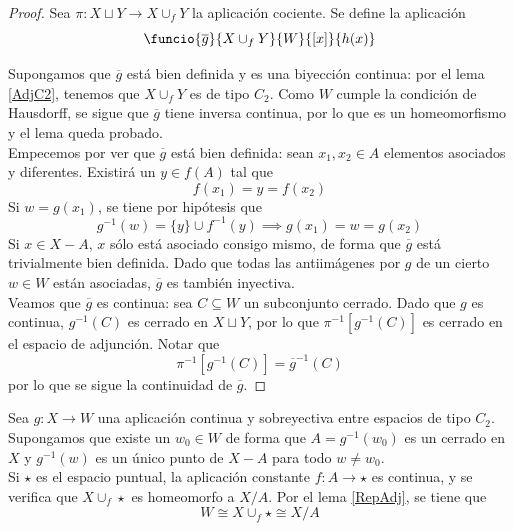 \begin{proof}
Sea $\pi: X\sqcup Y \longrightarrow X \cup_f Y$ la aplicación cociente. Se define la aplicación $$\funcio{\overline{g}}{X \cup_f Y}{W}{[x]}{h(x)}$$

Supongamos que $\overline{g}$ está bien definida y es una biyección continua: por el lema \ref{AdjC2}, tenemos que $X\cup_f Y$ es de tipo $C_2$. Como $W$ cumple la condición de Hausdorff, se sigue que $\overline{g}$ tiene inversa continua, por lo que es un homeomorfismo y el lema queda probado.
\\

Empecemos por ver que $\overline{g}$ está bien definida: sean $x_1, x_2 \in A$ elementos asociados y diferentes. Existirá un $y \in f(A)$ tal que $$f(x_1)=y=f(x_2)$$ Si $w=g(x_1)$, se tiene por hipótesis que $$g^{-1}(w)=\{y\}\cup f^{-1}(y) \implies g(x_1)=w=g(x_2)$$ Si $x \in X-A$, $x$ sólo está asociado consigo mismo, de forma que $\overline{g}$ está trivialmente bien definida. Dado que todas las antiimágenes por $g$ de un cierto $w \in W$ están asociadas, $\overline{g}$ es también inyectiva.
\\

Veamos que $\overline{g}$ es continua: sea $C \subseteq W$ un subconjunto cerrado. Dado que $g$ es continua, $g^{-1}(C)$ es cerrado en $X\sqcup Y$, por lo que $\pi^{-1}[g^{-1}(C)]$ es cerrado en el espacio de adjunción. Notar que $$\pi^{-1}[g^{-1}(C)]=\overline{g}^{-1}(C)$$ por lo que se sigue la continuidad de $\overline{g}$.
\end{proof}

Sea $g: X \longrightarrow W$ una aplicación continua y sobreyectiva entre espacios de tipo $C_2$. Supongamos que existe un $w_0 \in W$ de forma que $A=g^{-1}(w_0)$ es un cerrado en $X$ y $g^{-1}(w)$ es un único punto de $X-A$ para todo $w\neq w_0$.
\\

Si $\star$ es el espacio puntual, la aplicación constante $f: A \longrightarrow \star$ es continua, y se verifica que $X \cup_f \star$ es homeomorfo a $X/A$. Por el lema \ref{RepAdj}, se tiene que $$W \cong X \cup_f \star\cong X/A$$

